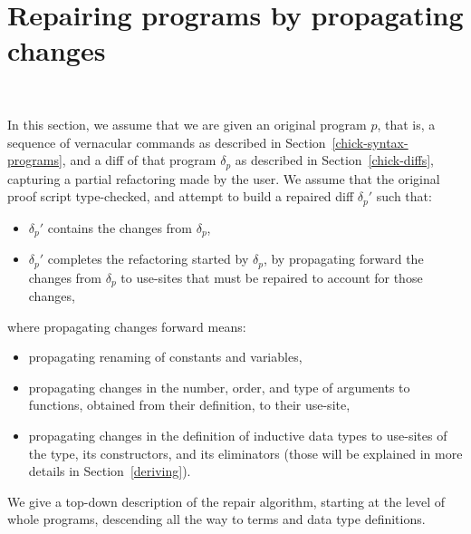 \section{Repairing programs by propagating changes}~\label{chick-repair}

In this section, we assume that we are given an original program $p$, that is, a
sequence of vernacular commands as described in
Section~\ref{chick-syntax-programs}, and a diff of that program $\delta_p$ as
described in Section~\ref{chick-diffs}, capturing a partial refactoring made by
the user.  We assume that the original proof script type-checked, and attempt to
build a repaired diff $\delta_p'$ such that:

\begin{itemize}

\item $\delta_p'$ contains the changes from $\delta_p$,

\item $\delta_p'$ completes the refactoring started by $\delta_p$, by
propagating forward the changes from $\delta_p$ to use-sites that must be
repaired to account for those changes,

\end{itemize}
%
where propagating changes forward means:

\begin{itemize}

\item propagating renaming of constants and variables,

\item propagating changes in the number, order, and type of arguments to
functions, obtained from their definition, to their use-site,

\item propagating changes in the definition of inductive data types to use-sites
of the type, its constructors, and its eliminators (those will be explained in
more details in Section~\ref{deriving}).

\end{itemize}

We give a top-down description of the repair algorithm, starting at the level of
whole programs, descending all the way to terms and data type definitions.






